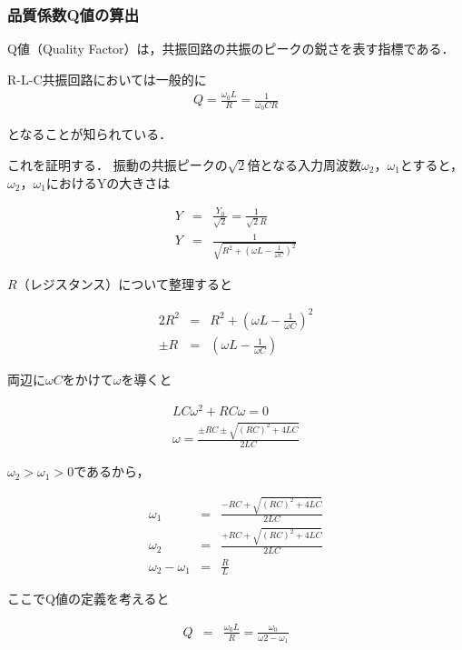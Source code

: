 \documentclass[dvipdfmx,titlepage,a4j]{jsarticle}  %
\numberwithin{equation}{section}
\begin{document}
\subsubsection{品質係数Q値の算出}
Q値（Quality Factor）は，共振回路の共振のピークの鋭さを表す指標である．

R-L-C共振回路においては一般的に
\begin{eqnarray}
  Q = \frac{\omega_0 L}{R} = \frac{1}{\omega_0 CR}
\end{eqnarray}

となることが知られている．

これを証明する．
振動の共振ピークの$\sqrt{2}$倍となる入力周波数$\omega_2$，$\omega_1$とすると，
$\omega_2$，$\omega_1$におけるYの大きさは

\begin{eqnarray}
  Y &=& \frac{Y_0}{\sqrt{2}} = \frac{1}{\sqrt{2}R} \\
  Y &=& \frac{1}{\sqrt{R^2 + (\omega L - \frac{1}{\omega C})^2}}
\end{eqnarray}

$R$（レジスタンス）について整理すると

\begin{eqnarray}
  2R^2 &=& R^2 + (\omega L - \frac{1}{\omega C})^2 \\
  \pm R &=& (\omega L - \frac{1}{\omega C})
\end{eqnarray}

両辺に$\omega C$をかけて$\omega$を導くと

\begin{eqnarray}
  LC \omega^2 + RC\omega = 0\\
  \omega = \frac{\pm RC \pm \sqrt{(RC)^2 + 4LC}}{2LC}
\end{eqnarray}

$\omega_2 > \omega_1 > 0$であるから，

\begin{eqnarray}
  \omega_1 &=& \frac{-RC + \sqrt{(RC)^2 + 4LC}}{2LC} \\
  \omega_2 &=& \frac{+RC + \sqrt{(RC)^2 + 4LC}}{2LC} \\
  \omega_2 - \omega_1 &=& \frac{R}{L}
\end{eqnarray}

ここでQ値の定義を考えると

\begin{eqnarray}
  Q &=& \frac{\omega_0 L}{R} = \frac{\omega_0}{\omega2 - \omega_1}\\
\end{eqnarray}
\end{document}
